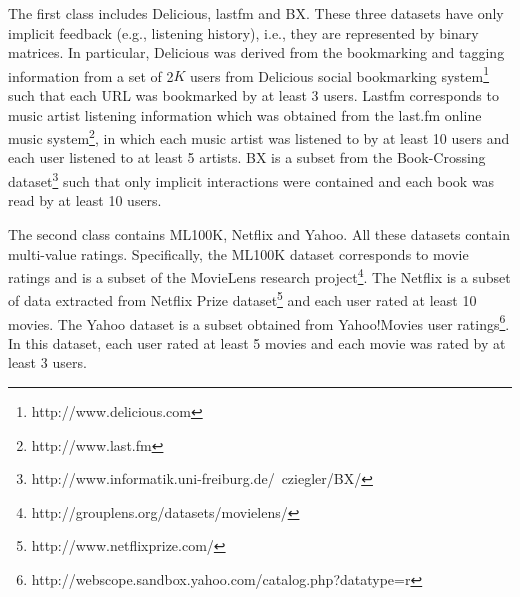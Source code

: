 \documentclass[letterpaper]{article}
\begin{document}
The first class includes Delicious, lastfm and BX. These three datasets have only implicit feedback (e.g., listening history), i.e., they are represented by binary matrices. In particular, Delicious was derived from the bookmarking and tagging information from a set of 2$K$ users from Delicious social bookmarking system\footnote{http://www.delicious.com} such that each URL was bookmarked by at least 3 users. Lastfm corresponds to music artist listening information which was obtained from the last.fm online music system\footnote{ http://www.last.fm }, in which each music artist was listened to by at least 10 users and each user listened to at least 5 artists. BX is a subset from the Book-Crossing dataset\footnote{http://www.informatik.uni-freiburg.de/~cziegler/BX/} such that only implicit interactions were contained and each book was read by at least 10 users. 

The second class contains ML100K, Netflix and Yahoo. All these datasets contain multi-value ratings. Specifically, the ML100K dataset corresponds to movie ratings and is a subset of the MovieLens research project\footnote{http://grouplens.org/datasets/movielens/}. The Netflix is a subset of data extracted from Netflix Prize dataset\footnote{http://www.netflixprize.com/} and each user rated at least 10 movies. The Yahoo dataset is a subset obtained from Yahoo!Movies user ratings\footnote{http://webscope.sandbox.yahoo.com/catalog.php?datatype=r}. In this dataset, each user rated at least 5 movies and each movie was rated by at least 3 users.
\end{document}
